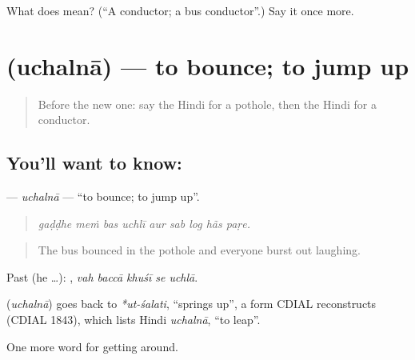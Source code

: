 \begin{tcolorbox}[breakable,colback=teal!4,colframe=teal!35!black,title={Before you move on}]
What does  mean? (\textquotedblleft{}A conductor; a bus conductor\textquotedblright{}.) Say it once more.
\end{tcolorbox}
\section[\texorpdfstring{\hi{उछलना} (uchalnā)}{उछलना (uchalnā)}]{ (uchalnā) — to bounce; to jump up}

\label{lesson:HI-C405-uchalnaintr}



\begin{quote}
Before the new one: say the Hindi for a pothole, then the Hindi for a conductor.
\end{quote}

\subsection*{You'll want to know: }
\textbf{} — \emph{uchalnā} — \textquotedblleft{}to bounce; to jump up\textquotedblright{}.

\begin{quote}
        
\end{quote}

\begin{quote}
\emph{gaḍḍhe meṁ bas uchlī aur sab log hãs paṛe.}
\end{quote}

\begin{quote}
The bus bounced in the pothole and everyone burst out laughing.
\end{quote}

Past (he …):     , \emph{vah baccā khuśī se uchlā}.

\begin{cousinweb}
\textbf{} (\emph{uchalnā}) goes back to \emph{*ut-śalati}, \textquotedblleft{}springs up\textquotedblright{}, a form CDIAL reconstructs (CDIAL 1843), which lists Hindi \emph{uchalnā}, \textquotedblleft{}to leap\textquotedblright{}.
\end{cousinweb}

\begin{grammarlens}[title={What you've built}]
One more word for getting around.
\end{grammarlens}


